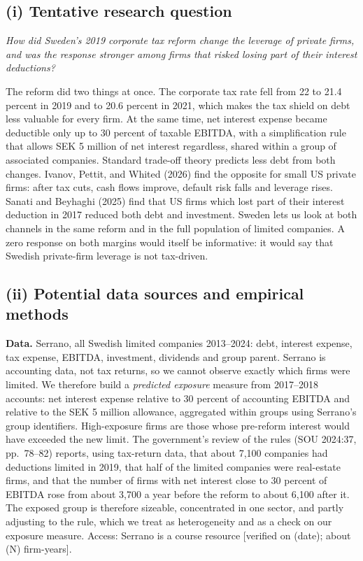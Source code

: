 \documentclass[12pt,a4paper]{article}
\begin{document}
\subsection{(i) Tentative research question}

\emph{How did Sweden's 2019 corporate tax reform change the leverage of private firms, and was the response stronger among firms that risked losing part of their interest deductions?}

The reform did two things at once. The corporate tax rate fell from 22 to 21.4 percent in 2019 and to 20.6 percent in 2021, which makes the tax shield on debt less valuable for every firm. At the same time, net interest expense became deductible only up to 30 percent of taxable EBITDA, with a simplification rule that allows SEK 5 million of net interest regardless, shared within a group of associated companies. Standard trade-off theory predicts less debt from both changes. Ivanov, Pettit, and Whited (2026) find the opposite for small US private firms: after tax cuts, cash flows improve, default risk falls and leverage rises. Sanati and Beyhaghi (2025) find that US firms which lost part of their interest deduction in 2017 reduced both debt and investment. Sweden lets us look at both channels in the same reform and in the full population of limited companies. A zero response on both margins would itself be informative: it would say that Swedish private-firm leverage is not tax-driven.

\subsection{(ii) Potential data sources and empirical methods}

\textbf{Data.} Serrano, all Swedish limited companies 2013--2024: debt, interest expense, tax expense, EBITDA, investment, dividends and group parent. Serrano is accounting data, not tax returns, so we cannot observe exactly which firms were limited. We therefore build a \emph{predicted exposure} measure from 2017--2018 accounts: net interest expense relative to 30 percent of accounting EBITDA and relative to the SEK 5 million allowance, aggregated within groups using Serrano's group identifiers. High-exposure firms are those whose pre-reform interest would have exceeded the new limit. The government's review of the rules (SOU 2024:37, pp.~78--82) reports, using tax-return data, that about 7,100 companies had deductions limited in 2019, that half of the limited companies were real-estate firms, and that the number of firms with net interest close to 30 percent of EBITDA rose from about 3,700 a year before the reform to about 6,100 after it. The exposed group is therefore sizeable, concentrated in one sector, and partly adjusting to the rule, which we treat as heterogeneity and as a check on our exposure measure. Access: Serrano is a course resource [verified on (date); about (N) firm-years].
\end{document}
